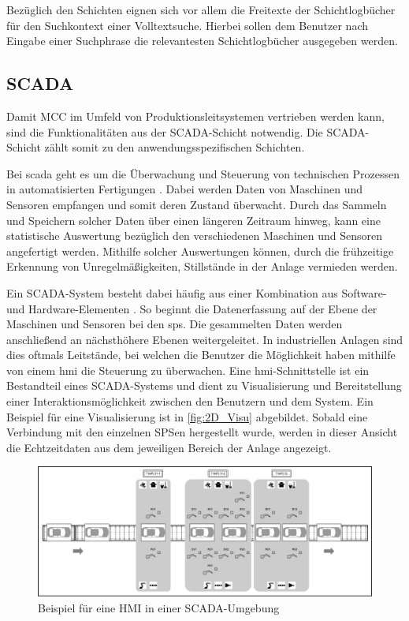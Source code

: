 Bezüglich den Schichten eignen sich vor allem die Freitexte der Schichtlogbücher für den Suchkontext einer Volltextsuche. Hierbei sollen dem Benutzer nach Eingabe einer Suchphrase die relevantesten Schichtlogbücher ausgegeben werden.

\subsection{SCADA\label{subsec3.1.3:Unterunterpunkt-3}}

Damit MCC im Umfeld von Produktionsleitsystemen vertrieben werden kann, sind die Funktionalitäten aus der \glqq SCADA\grqq{}-Schicht notwendig. Die \glqq SCADA\grqq{}-Schicht zählt somit zu den anwendungsspezifischen Schichten.

Bei \gls{scada} geht es um die Überwachung und Steuerung von technischen Prozessen in automatisierten Fertigungen \cite{ColeWangsness.2020}. Dabei werden Daten von Maschinen und Sensoren empfangen und somit deren Zustand überwacht. Durch das Sammeln und Speichern solcher Daten über einen längeren Zeitraum hinweg, kann eine statistische Auswertung bezüglich den verschiedenen Maschinen und Sensoren angefertigt werden. Mithilfe solcher Auswertungen können, durch die frühzeitige Erkennung von Unregelmäßigkeiten, Stillstände in der Anlage vermieden werden.

Ein SCADA-System besteht dabei häufig aus einer Kombination aus Software- und Hardware-Elementen \cite{copadata.com.2021}. So beginnt die Datenerfassung auf der Ebene der Maschinen und Sensoren bei den \gls{sps}. Die gesammelten Daten werden anschließend an nächsthöhere Ebenen weitergeleitet. In industriellen Anlagen sind dies oftmals Leitstände, bei welchen die Benutzer die Möglichkeit haben mithilfe von einem \gls{hmi} die Steuerung zu überwachen. Eine \gls{hmi}-Schnittstelle ist ein Bestandteil eines SCADA-Systems und dient zu Visualisierung und Bereitstellung einer Interaktionsmöglichkeit zwischen den Benutzern und dem System. Ein Beispiel für eine Visualisierung ist in \autoref{fig:2D_Visu} abgebildet. Sobald eine Verbindung mit den einzelnen SPSen hergestellt wurde, werden in dieser Ansicht die Echtzeitdaten aus dem jeweiligen Bereich der Anlage angezeigt.

\begin{figure}[H]
    \centering
    \includegraphics[width=0.8\linewidth]{images/2D_Visu.png}
    \caption{Beispiel für eine HMI in einer SCADA-Umgebung}
    \label{fig:2D_Visu}
\end{figure}

